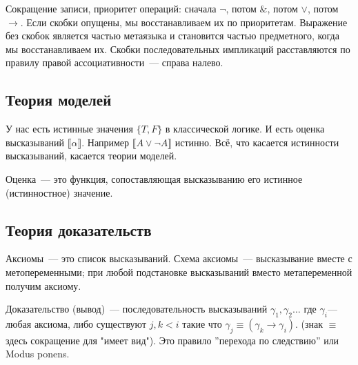 Сокращение записи, приоритет операций: сначала $\neg$, потом $\&$, потом $\vee$, потом $\to$.
Если скобки опущены, мы восстанавливаем их по приоритетам.
Выражение без скобок является частью метаязыка и становится частью предметного, 
когда мы восстанавливаем их.
Скобки последовательных импликаций расставляются по правилу правой ассоциативности~---
справа налево.
\subsection{Теория моделей}
У нас есть истинные значения $\{T, F\}$ в классической логике. 
И есть оценка высказываний $\llbracket \alpha\rrbracket$. 
Например $\llbracket A \lor \neg A\rrbracket$ истинно.
Всё, что касается истинности высказываний, касается теории моделей. 
\begin{definition}
    Оценка~--- это функция, сопоставляющая высказыванию его истинное (истинностное) значение.
\end{definition}
\subsection{Теория доказательств}
\begin{definition}
    Аксиомы~--- это список высказываний.
    Схема аксиомы~--- высказывание вместе с метопеременными; при любой подстановке высказываний вместо метапеременной получим аксиому. 
\end{definition}

\begin{definition}
    Доказательство (вывод)~--- последовательность высказываний $\gamma_1, \gamma_2\ldots$ где $\gamma_i$--- любая аксиома, 
    либо существуют $j,k < i$ такие что $\gamma_j \equiv (\gamma_k \to \gamma_i)$.
    (знак $\equiv$ здесь сокращение для "имеет вид").
    Это правило ''перехода по следствию'' или Modus ponens.
\end{definition}

